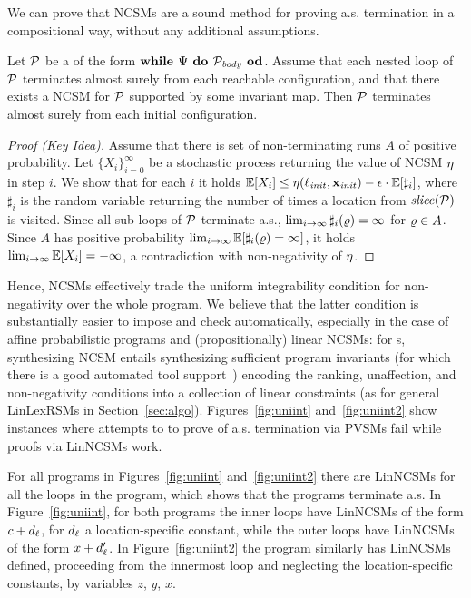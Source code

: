 We can prove that NCSMs are a sound method for proving a.s. termination in a compositional way, without any additional assumptions.

\begin{theorem}
\label{thm:nonneg-comp}
Let $\mathcal{P}$ be a \PP{} of the form $\textbf{while } \Psi \textbf{ do } 
\mathcal{P}_{\mathit{body}} \textbf{ od}$. Assume that each nested loop of $\mathcal{P}$ 
terminates almost surely from each reachable configuration, and that there 
exists a NCSM for $\mathcal{P}$ supported by some invariant map. Then $\mathcal{P}$ 
terminates almost surely from each initial configuration.
\end{theorem}
\begin{proof}[Proof (Key Idea)]
Assume that there is set of non-terminating runs $A$ of positive probability.
Let $\{X_i\}_{i=0}^{\infty}$ be a stochastic process returning the value of 
NCSM $\eta$ in step $i$. We show that for each $i$ it holds $\mathbb{E}[X_i] 
\leq \eta(\ell_{\mathit{init}},\mathbf{x}_{\mathit{init}}) - \epsilon\cdot \mathbb{E}[\sharp_i]$, where $\sharp_i$ is the 
random variable returning the number of times a location from 
$\mathit{slice}(\mathcal{P})$ is visited. Since all sub-loops of $\mathcal{P}$ terminate 
a.s., $\lim_{i\rightarrow \infty}\sharp_i(\varrho)=\infty$ for $\varrho\in A$. Since 
$A$ has positive probability $\lim_{i\rightarrow 
\infty}\mathbb{E}[\sharp_i(\varrho)=\infty]$, it holds $\lim_{i\rightarrow 
\infty}\mathbb{E}[X_i] = -\infty$, a contradiction with non-negativity of $\eta$.
\end{proof}

Hence, NCSMs effectively trade the uniform integrability condition for 
non-negativity over the whole program. We believe that the latter condition is 
substantially easier to impose and check automatically, especially in the case 
of affine probabilistic programs and (propositionally) linear NCSMs: for 
\APP{}s, synthesizing NCSM entails synthesizing sufficient program invariants 
(for which there is a good automated tool support~\cite{FG10:aspic})  encoding 
the ranking, 
unaffection, and non-negativity conditions into a collection of linear 
constraints (as for general LinLexRSMs in Section~\ref{sec:algo}). 
Figures~\ref{fig:uniint} and~\ref{fig:uniint2} show instances where attempts to 
to prove of a.s. termination via PVSMs fail while proofs via LinNCSMs work. 

\begin{example}
For all programs in Figures~\ref{fig:uniint} and~\ref{fig:uniint2} there are 
LinNCSMs for all the loops in the program, which shows that the programs 
terminate 
a.s. In Figure~\ref{fig:uniint}, for both programs the inner loops have 
LinNCSMs of the form $c+d_{\ell}$, for $d_{\ell}$ a location-specific constant, 
while the outer loops have LinNCSMs of the form $x+d_{\ell}'$. In 
Figure~\ref{fig:uniint2} the program similarly has LinNCSMs defined, proceeding 
from the innermost loop and neglecting the location-specific constants, by 
variables $z$, $y$, $x$.
\end{example}

